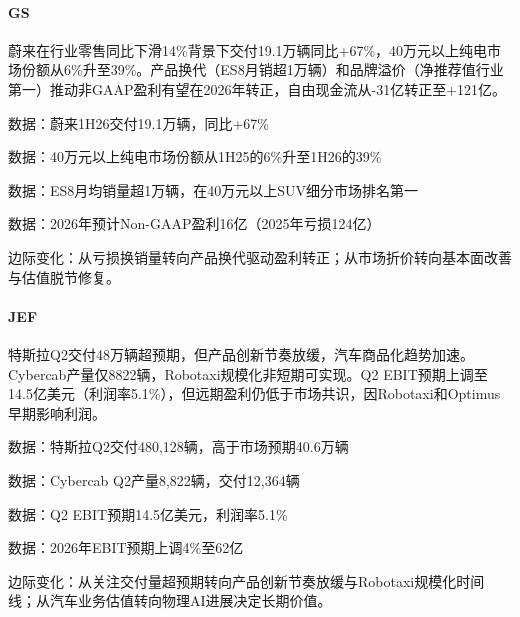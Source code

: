 \documentclass[11pt]{ctexart}
\begin{document}
\paragraph{GS} 蔚来在行业零售同比下滑14\%背景下交付19.1万辆同比+67\%，40万元以上纯电市场份额从6\%升至39\%。产品换代（ES8月销超1万辆）和品牌溢价（净推荐值行业第一）推动非GAAP盈利有望在2026年转正，自由现金流从-31亿转正至+121亿。
{\small\color{refgray}数据：蔚来1H26交付19.1万辆，同比+67\%\par}
{\small\color{refgray}数据：40万元以上纯电市场份额从1H25的6\%升至1H26的39\%\par}
{\small\color{refgray}数据：ES8月均销量超1万辆，在40万元以上SUV细分市场排名第一\par}
{\small\color{refgray}数据：2026年预计Non-GAAP盈利16亿（2025年亏损124亿）\par}
{\small\color{refgray}边际变化：从亏损换销量转向产品换代驱动盈利转正；从市场折价转向基本面改善与估值脱节修复。\par}
\paragraph{JEF} 特斯拉Q2交付48万辆超预期，但产品创新节奏放缓，汽车商品化趋势加速。Cybercab产量仅8822辆，Robotaxi规模化非短期可实现。Q2 EBIT预期上调至14.5亿美元（利润率5.1\%），但远期盈利仍低于市场共识，因Robotaxi和Optimus早期影响利润。
{\small\color{refgray}数据：特斯拉Q2交付480,128辆，高于市场预期40.6万辆\par}
{\small\color{refgray}数据：Cybercab Q2产量8,822辆，交付12,364辆\par}
{\small\color{refgray}数据：Q2 EBIT预期14.5亿美元，利润率5.1\%\par}
{\small\color{refgray}数据：2026年EBIT预期上调4\%至62亿\par}
{\small\color{refgray}边际变化：从关注交付量超预期转向产品创新节奏放缓与Robotaxi规模化时间线；从汽车业务估值转向物理AI进展决定长期价值。\par}
\end{document}
